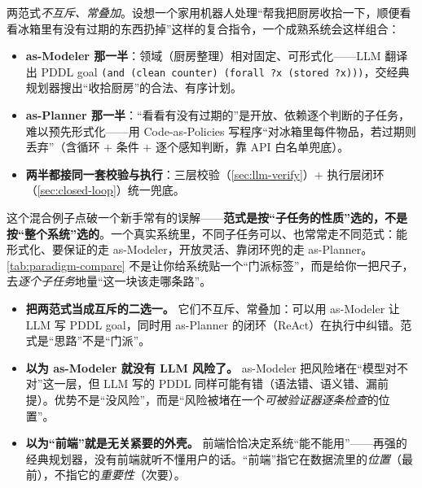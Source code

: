 两范式\emph{不互斥、常叠加}。设想一个家用机器人处理“帮我把厨房收拾一下，顺便看看冰箱里有没有过期的东西扔掉”这样的复合指令，一个成熟系统会这样组合：

\begin{itemize}
  \item \textbf{as-Modeler 那一半}：领域（厨房整理）相对固定、可形式化——LLM 翻译出 PDDL goal \texttt{(and (clean counter) (forall ?x (stored ?x)))}，交经典规划器搜出“收拾厨房”的合法、有序计划。
  \item \textbf{as-Planner 那一半}：“看看有没有过期的”是开放、依赖逐个判断的子任务，难以预先形式化——用 Code-as-Policies 写程序“对冰箱里每件物品，若过期则丢弃”（含循环 $+$ 条件 $+$ 逐个感知判断，靠 API 白名单兜底）。
  \item \textbf{两半都接同一套校验与执行}：三层校验（\cref{sec:llm-verify}）$+$ 执行层闭环（\cref{sec:closed-loop}）统一兜底。
\end{itemize}

\begin{insight}
这个混合例子点破一个新手常有的误解——\textbf{范式是按“子任务的性质”选的，不是按“整个系统”选的}。一个真实系统里，不同子任务可以、也常常走不同范式：能形式化、要保证的走 as-Modeler，开放灵活、靠闭环兜的走 as-Planner。\cref{tab:paradigm-compare} 不是让你给系统贴一个“门派标签”，而是给你一把尺子，去\emph{逐个子任务}地量“这一块该走哪条路”。
\end{insight}

\begin{pitfall}[本节常见陷阱]
\begin{itemize}
  \item \textbf{把两范式当成互斥的二选一。} 它们不互斥、常叠加：可以用 as-Modeler 让 LLM 写 PDDL goal，同时用 as-Planner 的闭环（ReAct）在执行中纠错。范式是“思路”不是“门派”。
  \item \textbf{以为 as-Modeler 就没有 LLM 风险了。} as-Modeler 把风险堵在“模型对不对”这一层，但 LLM 写的 PDDL 同样可能有错（语法错、语义错、漏前提）。优势不是“没风险”，而是“风险被堵在一个\emph{可被验证器逐条检查}的位置”。
  \item \textbf{以为“前端”就是无关紧要的外壳。} 前端恰恰决定系统“能不能用”——再强的经典规划器，没有前端就听不懂用户的话。“前端”指它在数据流里的\emph{位置}（最前），不指它的\emph{重要性}（次要）。
\end{itemize}
\end{pitfall}

